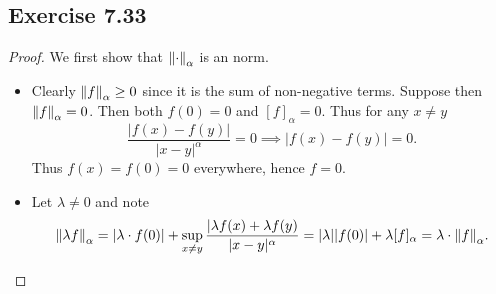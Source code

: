 \documentclass[hw_all.tex]{subfiles}
\begin{document}
\subsection{Exercise 7.33}
\begin{proof}
    We first show that $\norm{\cdot}_{\alpha}$ is an norm.
    \begin{itemize}
        \item
            Clearly $\norm{f}_{\alpha} \geq 0$ since it is the sum of non-negative terms. Suppose then $\norm{f}_{\alpha} = 0$. Then both $f(0) = 0$ and $[f]_{\alpha} = 0$. Thus for any $x \neq y$
            \[
                \frac{|f(x) - f(y)|}{|x-y|^\alpha} = 0 \implies |f(x) - f(y)| = 0
            .\]
            Thus $f(x) = f(0) = 0$ everywhere, hence $f = 0$.

        \item 
            Let $\lambda \neq 0$ and note
            \[
                \norm{\lambda f}_{\alpha} = |\lambda \cdot f(0)| + \sup_{x \neq y} \frac{|\lambda f(x) + \lambda f(y)}{|x-y|^{\alpha}} = |\lambda| |f(0)| + \lambda [f]_{\alpha} = \lambda\cdot \norm{f}_{\alpha}
            .\]


\end{itemize}
\end{proof}
\end{document}
